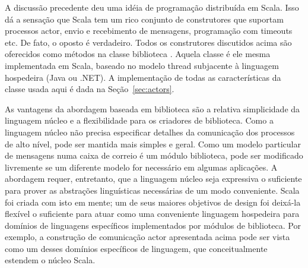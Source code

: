 A discussão precedente deu uma idéia de programação distribuída em Scala. Isso
dá a sensação que Scala tem um rico conjunto de construtores que suportam
processos actor, envio e recebimento de mensagens, programação com timeouts etc.
De fato, o oposto é verdadeiro. Todos os construtores discutidos acima são 
oferecidos como métodos na classe biblioteca . Aquela classe é
ele mesma implementada em Scala, baseado no modelo thread subjacente à linguagem 
hospedeira (Java ou .NET). A implementação de todas as características da 
classe  usada aqui é dada na Seção~\ref{sec:actors}.     

As vantagens da abordagem baseada em biblioteca são a relativa simplicidade
da linguagem núcleo e a flexibilidade para os criadores de biblioteca. Como 
a linguagem núcleo não precisa especificar detalhes da comunicação dos 
processos de alto nível, pode ser mantida mais simples e geral. Como
um modelo particular de mensagens numa caixa de correio é um módulo biblioteca, 
pode ser modificado livremente se um diferente modelo for necessário em algumas 
aplicações. A abordagem requer, entretanto, que a linguagem núcleo seja expressiva
o suficiente para prover as abstrações linguísticas necessárias de um modo 
conveniente. Scala foi criada com isto em mente; um de seus maiores objetivos de 
design foi deixá-la flexível o suficiente para atuar como uma conveniente linguagem
hospedeira para domínios de linguagens específicos implementados por módulos de 
biblioteca. Por exemplo, a construção de comunicação actor apresentada acima
pode ser vista como um desses domínios específicos de linguagem, que conceitualmente
estendem o núcleo Scala.  

